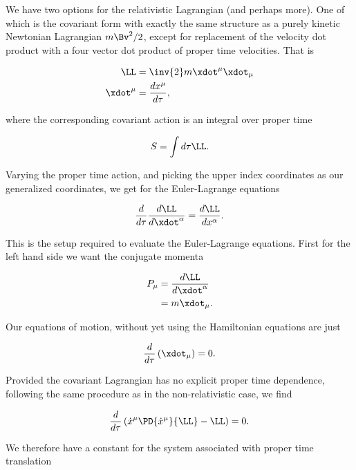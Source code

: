 We have two options for the relativistic Lagrangian (and perhaps more).  One of which is the covariant form with exactly the same structure as a purely kinetic Newtonian Lagrangian $m \Bv^2/2$, except for replacement of the velocity dot product with a four vector dot product of proper time velocities.  That is

\begin{align}\label{eqn:hamiltonian:qqq1}
\LL &= \inv{2} m \xdot^\mu \xdot_\mu \\
\xdot^\mu &= \frac{d x^\mu}{d \tau},
\end{align}

where the corresponding covariant action is an integral over proper time

\begin{align}\label{eqn:hamiltonian:qqq2}
S = \int d\tau \LL.
\end{align}

Varying the proper time action, and picking the upper index coordinates as our generalized coordinates, we get for the Euler-Lagrange equations 

\begin{align}\label{eqn:hamiltonian:qqq3}
\frac{d}{d \tau} \frac{d \LL}{d \xdot^\alpha} = \frac{d \LL}{d x^\alpha}.
\end{align}

This is the setup required to evaluate the Euler-Lagrange equations.  First for the left hand side we want the conjugate momenta

\begin{align*}
P_\mu 
&= \frac{d \LL}{d \xdot^\alpha} \\
&= m \xdot_\mu.
\end{align*}

Our equations of motion, without yet using the Hamiltonian equations are just

\begin{align}\label{eqn:hamiltonian:qqq2x}
\frac{d}{d\tau} \left( \xdot_\mu \right) = 0.
\end{align}

Provided the covariant Lagrangian has no explicit proper time dependence, following the same procedure as in the non-relativistic case, we find

\begin{align}\label{eqn:hamiltonian:foo2r}
\frac{d}{d\tau} \left( \dot{x}^\mu \PD{\dot{x}^\mu}{\LL} -\LL \right) = 0.
\end{align}

We therefore have a constant for the system associated with proper time translation

